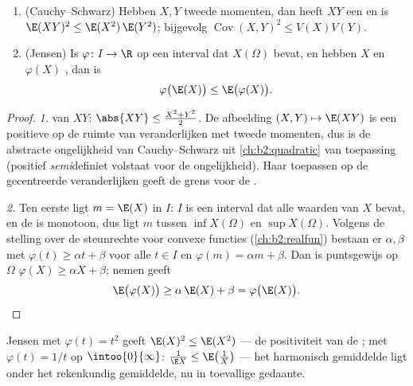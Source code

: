 \begin{theorem}\label{thm:b2:randomvar:jensen}
\leavevmode
\begin{enumerate}
\item (Cauchy--Schwarz) Hebben $X, Y$ tweede momenten, dan heeft
$XY$ een  en is $\E(XY)^2 \leq
\E(X^2)\,\E(Y^2)$; bijgevolg $\operatorname{Cov}(X,Y)^2 \leq
V(X)V(Y)$.
\item (Jensen) Is $\varphi \colon I \to \R$  op een interval
dat $X(\Omega)$ bevat, en hebben $X$ en $\varphi(X)$
, dan is
\[
\varphi\bigl(\E(X)\bigr) \leq \E\bigl(\varphi(X)\bigr) .
\]
\end{enumerate}
\end{theorem}

\begin{proof}
\emph{1.}  van $XY$: $\abs{XY} \leq \frac{X^2 +
Y^2}2$. De afbeelding $(X, Y) \mapsto \E(XY)$ is een positieve
 op de ruimte van veranderlijken met
tweede momenten, dus is de abstracte ongelijkheid van
Cauchy--Schwarz uit \cref{ch:b2:quadratic} van toepassing
(positief \emph{semi}definiet volstaat voor de ongelijkheid). Haar
toepassen op de gecentreerde veranderlijken geeft de grens voor de
.

\emph{2.} Ten eerste ligt $m = \E(X)$ in $I$: $I$ is een interval
dat alle waarden van $X$ bevat, en de  is
monotoon, dus ligt $m$ tussen $\inf X(\Omega)$ en $\sup
X(\Omega)$. Volgens de stelling over de steunrechte voor convexe
functies (\cref{ch:b2:realfun}) bestaan er $\alpha, \beta$ met
$\varphi(t) \geq \alpha t + \beta$ voor alle $t \in I$ en
$\varphi(m) = \alpha m + \beta$. Dan is puntsgewijs op $\Omega$
$\varphi(X) \geq \alpha X + \beta$;  nemen geeft
\[
\E\bigl(\varphi(X)\bigr) \geq \alpha\,\E(X) + \beta
= \varphi\bigl(\E(X)\bigr). \qedhere
\]
\end{proof}

\begin{example}
Jensen met $\varphi(t) = t^2$ geeft $\E(X)^2 \leq \E(X^2)$ --- de
positiviteit van de ; met $\varphi(t) = 1/t$ op
$\intoo{0}{\infty}$: $\frac{1}{\E X} \leq \E\bigl(\frac1X\bigr)$
--- het harmonisch gemiddelde ligt onder het rekenkundig
gemiddelde, nu in toevallige gedaante.
\end{example}

